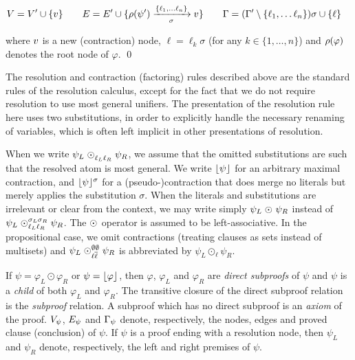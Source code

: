 \begin{definition}
\begin{itemize}
    \begin{small}
    \begin{align*}
      V &= V' \cup \{\n \} &\quad
      E &= E' \cup \{ \raiz{\psi'} \xrightarrow[\sigma]{\{\ell_1, \ldots \ell_n\}} \n \} 
      &\quad
     \Gamma &= (\clause' \setminus \{ \ell_1, \ldots \ell_n \} ) \sigma \cup \{ \ell \}
    \end{align*}
    \end{small}
    where $\n$ is a new (contraction) node, $\ell = \ell_k \sigma$ (for any $k \in \{1,\ldots, n\}$) and $\raiz{\varphi}$ denotes the root node of $\varphi$.
  \qed
\end{itemize}
\end{definition}


\noindent
The resolution and contraction (factoring) rules described above are the standard rules of the resolution calculus, except for the fact that we do not require resolution to use most general unifiers. The presentation of the resolution rule here uses two substitutions, in order to explicitly handle the necessary renaming of variables, which is often left implicit in other presentations of resolution.

When we write $\psi_L \res{\ell_L}{}{\ell_R}{} \psi_R$, we assume that the omitted substitutions are such that the resolved atom is most general. 
We write $\con{\psi}{}{}$ for an arbitrary maximal contraction, and $\con{\psi}{}{\sigma}$ for a (pseudo-)contraction that does merge no literals but merely applies the substitution $\sigma$. 
When the literals and substitutions are irrelevant or clear from the context, we may write simply $\psi_L \res{}{}{}{} \psi_R$ instead of $\psi_L \res{\ell_L}{\sigma_L}{\ell_R}{\sigma_R} \psi_R$.
The $\res{}{}{}{}$ operator is assumed to be left-associative. 
In the propositional case, we omit contractions (treating clauses as sets instead of multisets) and $\psi_L \res{\ell}{\emptyset}{\dual{\ell}}{\emptyset} \psi_R$ is abbreviated by $\psi_L \odot_{\ell} \psi_R$.

If $\psi = \varphi_L \odot \varphi_R$ or $\psi = \con{\varphi}{}{}$, then $\varphi$, $\varphi_L$ and $\varphi_R$ are \emph{direct
subproofs} of $\psi$ and $\psi$ is a \emph{child} of both $\varphi_L$ and $\varphi_R$. The
transitive closure of the direct subproof relation is the \emph{subproof} relation. A subproof which
has no direct subproof is an \emph{axiom} of the proof.
%
$\Vertices{\psi}$, $\Edges{\psi}$ and $\Conclusion{\psi}$
denote, respectively, the nodes, edges and proved clause (conclusion) of $\psi$. If $\psi$ is a proof ending with a resolution node, then $\psi_L$ and $\psi_R$ denote, respectively, the left and right premises of $\psi$.
